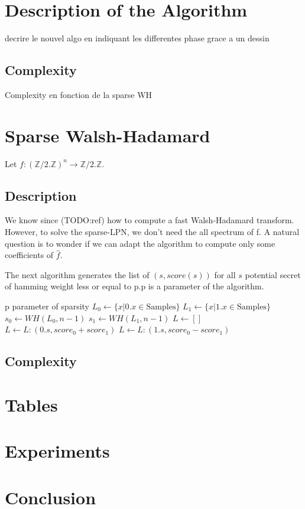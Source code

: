 \documentclass{llncs}		%
\begin{document}
\section{Description of the Algorithm}

decrire le nouvel algo en indiquant les differentes phase grace a un dessin

\subsection{Complexity}
Complexity en fonction de la sparse WH

\section{Sparse Walsh-Hadamard}
Let $f:(\mathbb{Z}/2.\mathbb{Z})^n \rightarrow \mathbb{Z}/2.\mathbb{Z}$.

\subsection{Description}
We know since (TODO:ref) how to compute a fast Walsh-Hadamard transform.
However, to solve the sparse-LPN, we don't need the all spectrum of f. 
A natural question is to wonder if we can adapt the algorithm to compute only
some coefficients of $\hat{f}$. 


The next algorithm generates the list of $(s,score(s))$ for all $s$ potential secret of
hamming weight less or equal to p.p is a parameter of the algorithm.
\begin{framed}
\begin{algorithmic}
\State p parameter of sparsity
   \EndIf
\State $L_0 \gets \{x | 0.x \in \text{Samples} \}$
\State $L_1 \gets \{x | 1.x \in \text{Samples} \}$
\State $s_0 \gets WH(L_0,n-1)$ 
\State $s_1 \gets WH(L_1,n-1)$
\State$ L \gets []$
  \State $ L\gets L:(0.s, score_0 + score_1)    $
   $L\gets L: (1.s ,  score_0 - score_1)  $ \EndIf 
\EndFor
{}
\EndFunction
\end{algorithmic}
\end{framed}

\subsection{Complexity}

\section{Tables}

\section{Experiments}

\section{Conclusion}


%
%


%
 
\end{document}
